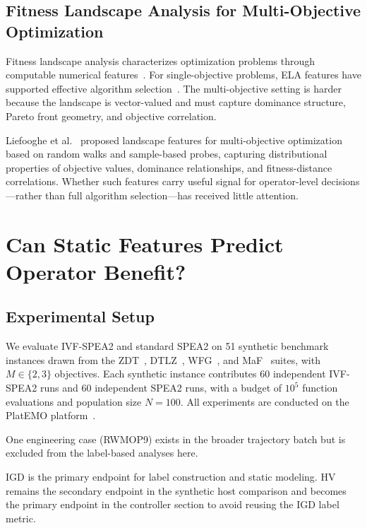 \documentclass[runningheads]{llncs}
\begin{document}
\subsection{Fitness Landscape Analysis for Multi-Objective Optimization}
\label{sec:fla_background}

Fitness landscape analysis characterizes optimization problems through
computable numerical features~\cite{mersmann2011exploratory}. For
single-objective problems, ELA features have supported effective algorithm
selection~\cite{kerschke2019automated}. The multi-objective setting is harder
because the landscape is vector-valued and must capture dominance structure,
Pareto front geometry, and objective correlation.

Liefooghe et al.~\cite{liefooghe2018landscape} proposed landscape features
for multi-objective optimization based on random walks and sample-based
probes, capturing distributional properties of objective values, dominance
relationships, and fitness-distance correlations. Whether such features carry
useful signal for operator-level decisions---rather than full algorithm
selection---has received little attention.


\section{Can Static Features Predict Operator Benefit?}
\label{sec:fla}

\subsection{Experimental Setup}
\label{sec:fla_setup}

We evaluate IVF-SPEA2 and standard SPEA2 on 51 synthetic benchmark instances
drawn from the ZDT~\cite{zitzler2000comparison},
DTLZ~\cite{deb2005scalable}, WFG~\cite{huband2006review}, and
MaF~\cite{cheng2017benchmark} suites, with $M \in \{2, 3\}$ objectives.
Each synthetic instance contributes 60 independent IVF-SPEA2 runs and
60 independent SPEA2 runs, with a budget of $10^5$ function evaluations and
population size $N\!=\!100$. All experiments are conducted on the
PlatEMO platform~\cite{tian2017platemo}.

One engineering case (RWMOP9) exists in the broader trajectory batch but is
excluded from the label-based analyses here.

IGD is the primary endpoint for label construction and static modeling. HV
remains the secondary endpoint in the synthetic host comparison and becomes
the primary endpoint in the controller section to avoid reusing the IGD label
metric.
\end{document}
